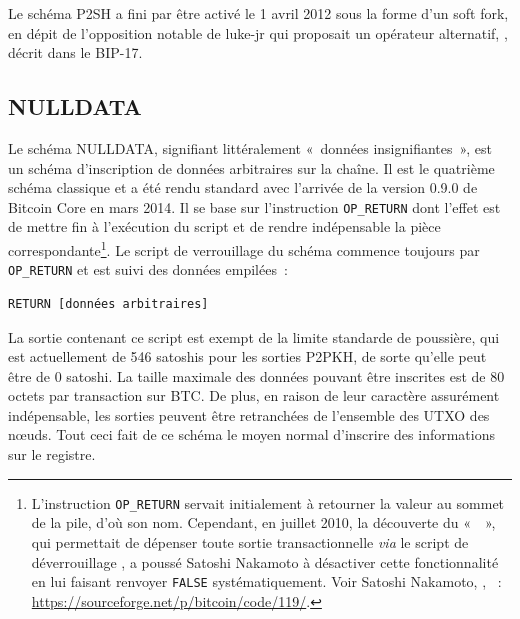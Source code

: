 Le schéma P2SH a fini par être activé le 1\ier{} avril 2012 sous la forme d'un soft fork, en dépit de l'opposition notable de luke-jr qui proposait un opérateur alternatif, , décrit dans le BIP-17.

\subsection{NULLDATA} Le schéma NULLDATA, signifiant littéralement «~données insignifiantes~», est un schéma d'inscription de données arbitraires sur la chaîne. Il est le quatrième schéma classique et a été rendu standard avec l'arrivée de la version 0.9.0 de Bitcoin Core en mars 2014. Il se base sur l'instruction \texttt{OP\_RETURN} dont l'effet est de mettre fin à l'exécution du script et de rendre indépensable la pièce correspondante\footnote{L'instruction \texttt{OP\_RETURN} servait initialement à retourner la valeur au sommet de la pile, d'où son nom. Cependant, en juillet 2010, la découverte du «~~», qui permettait de dépenser toute sortie transactionnelle \emph{via} le script de déverrouillage , a poussé Satoshi Nakamoto à désactiver cette fonctionnalité en lui faisant renvoyer \texttt{FALSE} systématiquement. Voir Satoshi Nakamoto, , ~: \url{https://sourceforge.net/p/bitcoin/code/119/}.}. Le script de verrouillage du schéma commence toujours par \texttt{OP\_RETURN} et est suivi des données empilées~:

\begin{Verbatim}[fontsize=\footnotesize]
RETURN [données arbitraires]
\end{Verbatim}

La sortie contenant ce script est exempt de la limite standarde de poussière, qui est actuellement de 546 satoshis pour les sorties P2PKH, de sorte qu'elle peut être de 0 satoshi. La taille maximale des données pouvant être inscrites est de 80 octets par transaction sur BTC. De plus, en raison de leur caractère assurément indépensable, les sorties peuvent être retranchées de l'ensemble des UTXO des nœuds. Tout ceci fait de ce schéma le moyen normal d'inscrire des informations sur le registre.

